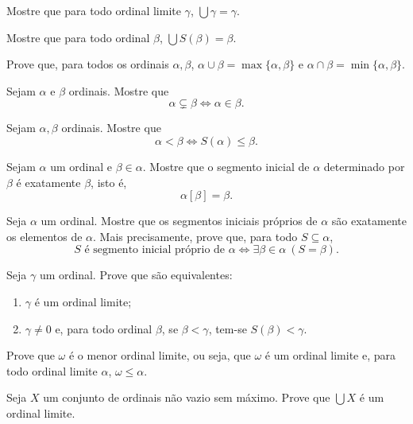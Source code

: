 \begin{exercise}[$\BST$]
    Mostre que para todo ordinal limite $\gamma$, $\bigcup \gamma=\gamma$.
\end{exercise}
\begin{exercise}[$\BST$]
    Mostre que para todo ordinal $\beta$, $\bigcup S(\beta)=\beta$.
\end{exercise}
\begin{exercise}[$\BST$]
    Prove que, para todos os ordinais $\alpha, \beta$, $\alpha\cup \beta=\max\{\alpha, \beta\}$ e $\alpha\cap \beta=\min\{\alpha, \beta\}$.
\end{exercise}
\begin{exercise}[$\BST$]
    Sejam $\alpha$ e $\beta$ ordinais.
    Mostre que
    \[
    \alpha\subsetneq \beta \iff \alpha\in \beta.
    \]
\end{exercise}
\begin{exercise}[$\BST$]
    Sejam $\alpha,\beta$ ordinais.
    Mostre que
    \[
    \alpha<\beta \iff S(\alpha)\leq \beta.
    \]
\end{exercise}
\begin{exercise}[$\BST$]\label{exr:segmentoInicialDeOrdinal}
    Sejam $\alpha$ um ordinal e $\beta\in \alpha$.
    Mostre que o segmento inicial de $\alpha$ determinado por $\beta$ é exatamente $\beta$, isto é,
    \[
    \alpha[\beta]=\beta.
    \]
\end{exercise}

\begin{exercise}[$\BST$]
    Seja $\alpha$ um ordinal.
    Mostre que os segmentos iniciais próprios de $\alpha$ são exatamente os elementos de $\alpha$.
    Mais precisamente, prove que, para todo $S\subseteq \alpha$,
    \[
    S \text{ é segmento inicial próprio de }\alpha \iff \exists \beta\in \alpha \ (S=\beta).
    \]
\end{exercise}

\begin{exercise}[$\BST$]
    Seja $\gamma$ um ordinal.
    Prove que são equivalentes:
    \begin{enumerate}[label=(\alph*)]
        \item $\gamma$ é um ordinal limite;
        \item $\gamma\neq 0$ e, para todo ordinal $\beta$, se $\beta<\gamma$, tem-se $S(\beta)< \gamma$.
    \end{enumerate}
\end{exercise}

\begin{exercise}[$\BSTI$]
    Prove que $\omega$ é o menor ordinal limite, ou seja, que $\omega$ é um ordinal limite e, para todo ordinal limite $\alpha$, $\omega\leq \alpha$.
\end{exercise}
\begin{exercise}[$\BST$]
    Seja $X$ um conjunto de ordinais não vazio sem máximo.
    Prove que $\bigcup X$ é um ordinal limite.
\end{exercise}


